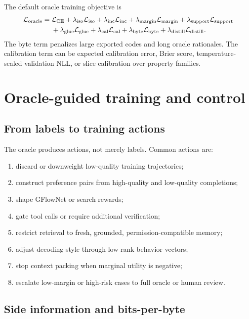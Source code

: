\documentclass[11pt]{article}
\theoremstyle{definition}
\theoremstyle{remark}
\newcommand{\loss}{\mathcal{L}}
\numberwithin{equation}{section}
\begin{document}
The default oracle training objective is
\begin{align}
\loss_{\rm oracle}={}&\loss_{\rm CE}+\lambda_{\rm iso}\loss_{\rm iso}+\lambda_{\rm inc}\loss_{\rm inc}+\lambda_{\rm margin}\loss_{\rm margin}+\lambda_{\rm support}\loss_{\rm support}\nonumber\\
&+\lambda_{\rm glue}\loss_{\rm glue}+\lambda_{\rm cal}\loss_{\rm cal}+\lambda_{\rm byte}\loss_{\rm byte}+\lambda_{\rm distill}\loss_{\rm distill}.
\end{align}
The byte term penalizes large exported codes and long oracle rationales.  The calibration term can be expected calibration error, Brier score, temperature-scaled validation NLL, or slice calibration over property families.

\section{Oracle-guided training and control}

\subsection{From labels to training actions}

The oracle produces actions, not merely labels.  Common actions are:
\begin{enumerate}
    \item discard or downweight low-quality training trajectories;
    \item construct preference pairs from high-quality and low-quality completions;
    \item shape GFlowNet or search rewards;
    \item gate tool calls or require additional verification;
    \item restrict retrieval to fresh, grounded, permission-compatible memory;
    \item adjust decoding style through low-rank behavior vectors;
    \item stop context packing when marginal utility is negative;
    \item escalate low-margin or high-risk cases to full oracle or human review.
\end{enumerate}

\subsection{Side information and bits-per-byte}
\end{document}
